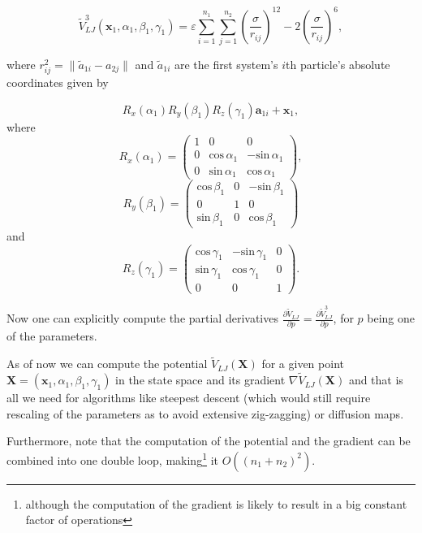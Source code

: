 \begin{equation}
	\tilde V_{LJ}^3(\mathbf x_1,\alpha_1,\beta_1,\gamma_1) = \varepsilon 
	\sum_{i=1}^{n_1}\sum_{j=1}^{n_2}\left(\frac{\sigma}{r_{ij}}\right)^{12} 
	- 2 \left(\frac{\sigma}{r_{ij}}\right)^6,
\end{equation}

where $r_{ij}^2 = \|\tilde a_{1i}-a_{2j}\|$ and $\tilde a_{1i}$ are the first system's $i$th particle's absolute coordinates given by

$$R_x(\alpha_1)R_y(\beta_1)R_z(\gamma_1)\mathbf a_{1i} + \mathbf x_1,$$ where $$R_x(\alpha_1) = \left(\begin{array}{ccc}
1 & 0 & 0 \\
0 & \text{cos}\,\alpha_1 & -\text{sin}\,\alpha_1 \\
0 & \text{sin}\,\alpha_1 &  \text{cos}\,\alpha_1 \end{array}\right),$$ $$R_y(\beta_1)=\left(\begin{array}{ccc}
\text{cos}\,\beta_1 & 0 & -\text{sin}\,\beta_1 \\
0 & 1 & 0\\
\text{sin}\,\beta_1 & 0 &  \text{cos}\,\beta_1\end{array}\right)$$ and $$R_z(\gamma_1) = \left(\begin{array}{ccc}
\text{cos}\,\gamma_1 & -\text{sin}\,\gamma_1 & 0 \\
\text{sin}\,\gamma_1 &  \text{cos}\,\gamma_1 & 0 \\
0 & 0 & 1 \end{array}\right).$$

Now one can explicitly compute the partial derivatives $\frac{\partial \tilde V_{LJ}}{\partial p} = \frac{\partial \tilde V_{LJ}^3}{\partial p}$, for $p$ being one of the parameters.

As of now we can compute the potential $\tilde V_{LJ}(\mathbf X)$ for a given point $\mathbf X = (\mathbf x_1,\alpha_1,\beta_1,\gamma_1)$ in the state space and its gradient $\nabla \tilde V_{LJ}(\mathbf X)$ and that is all we need for algorithms like steepest descent (which would still require rescaling of the parameters as to avoid extensive zig-zagging) or diffusion maps.

Furthermore, note that the computation of the potential and the gradient can be combined into one double loop, making\footnote{although the computation of the gradient is likely to result in a big constant factor of operations} it $O\left((n_1+n_2)^2\right)$.



